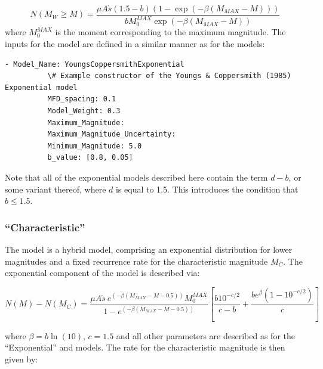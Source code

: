 \begin{equation}
N \left( {M_W \geq M} \right) = \frac{\mu A \dot{s} \left( {1.5 - b} \right) \left( {1 - \exp \left( {-\beta \left( {M_{MAX} - M} \right)} \right)} \right)}{b M_{0}^{MAX} \exp \left( {-\beta \left( {M_{MAX} - M} \right)} \right)}
\end{equation}
where $M_0^{MAX}$ is the moment corresponding to the maximum magnitude. The inputs for the model are defined in a similar manner as for the \textcite{AndersonLuco1983} models:

\begin{Verbatim}[frame=single, commandchars=\\\{\}, fontsize=\scriptsize]
        - Model_Name: YoungsCoppersmithExponential
          \# Example constructor of the Youngs & Coppersmith (1985) Exponential model
          MFD_spacing: 0.1
          Model_Weight: 0.3
          Maximum_Magnitude:
          Maximum_Magnitude_Uncertainty:
          Minimum_Magnitude: 5.0
          b_value: [0.8, 0.05]
\end{Verbatim}

Note that all of the exponential models described here contain the term $d - b$, or some variant thereof, where $d$ is equal to 1.5. This introduces the condition that $b \leq 1.5$. 

\subsubsection{\textcite{YoungsCoppersmith1985} ``Characteristic''}

The \textcite{YoungsCoppersmith1985} model is a hybrid model, comprising an exponential distribution for lower magnitudes and a fixed recurrence rate for the characteristic magnitude $M_C$. The exponential component of the model is described via:

\begin{equation}
N \left( M \right) - N \left( {M_C} \right) = \frac{\mu A \dot{s}\ e^{\left( {-\beta \left( {M_{MAX} - M - 0.5} \right)}\right)} M_{0}^{MAX}}{1 - e^{\left( {-\beta \left( {M_{MAX} - M - 0.5} \right)} \right)}} 
 \left[ {\frac{b10^{-c/2}}{c - b} + \frac{b e^{\beta}\left({1 - 10^{-c/2}}\right)}{c}} \right]\end{equation}

where $\beta = b \ln \left( {10} \right)$, $c = 1.5$ and all other parameters are described as for the \textcite{YoungsCoppersmith1985} ``Exponential'' and \textcite{AndersonLuco1983} models. The rate for the characteristic magnitude is then given by:

